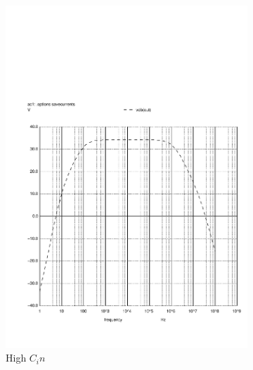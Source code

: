 \begin{figure}[H] 
\centering
\begin{subfigure}{0.4\textwidth}
\includegraphics[width=\textwidth]{c1high.pdf}
\caption{High $C_in$}
\label{highcin}
\end{subfigure}
\begin{subfigure}{0.3\textwidth}

\end{subfigure}
\end{figure}
